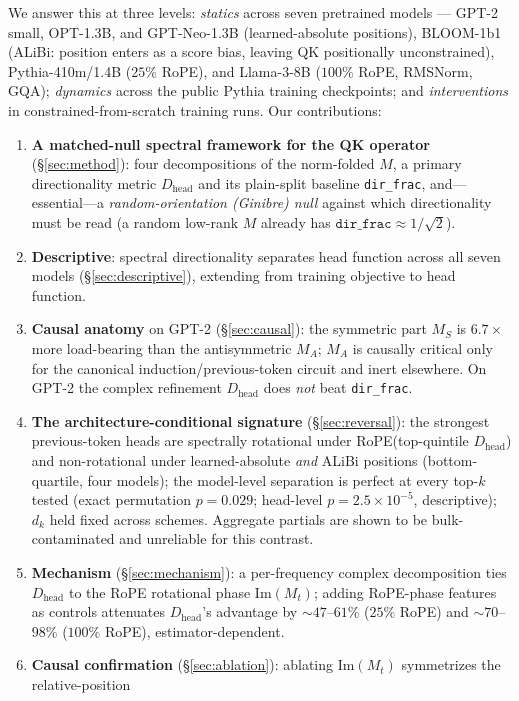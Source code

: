 \documentclass[11pt]{article}
\newcommand{\dirfrac}{\texttt{dir\_frac}\xspace}
\newcommand{\Dhead}{\ensuremath{D_{\text{head}}}\xspace}
\newcommand{\M}{\ensuremath{M}\xspace}
\newcommand{\MS}{\ensuremath{M_S}\xspace}
\newcommand{\MA}{\ensuremath{M_A}\xspace}
\newcommand{\Mt}{\ensuremath{M_t}\xspace}
\newcommand{\Rope}{RoPE\xspace}
\begin{document}
We answer this at three levels: \emph{statics} across seven pretrained models --- GPT-2 small, OPT-1.3B, and
GPT-Neo-1.3B (learned-absolute positions), BLOOM-1b1 (ALiBi: position enters as a score bias, leaving QK positionally
unconstrained), Pythia-410m/1.4B ($25\%$ \Rope), and Llama-3-8B ($100\%$ \Rope, RMSNorm, GQA); \emph{dynamics} across
the public Pythia training checkpoints; and \emph{interventions} in constrained-from-scratch training runs. Our
contributions:
\begin{enumerate}\itemsep2pt
\item \textbf{A matched-null spectral framework for the QK operator} (\S\ref{sec:method}): four decompositions of the
norm-folded \M, a primary directionality metric \Dhead and its plain-split baseline \dirfrac, and---essential---a
\emph{random-orientation (Ginibre) null} against which directionality must be read (a random low-rank \M already has
$\dirfrac\approx1/\sqrt2$).
\item \textbf{Descriptive}: spectral directionality separates head function across all seven models
(\S\ref{sec:descriptive}), extending \citet{saponati2025} from training objective to head function.
\item \textbf{Causal anatomy} on GPT-2 (\S\ref{sec:causal}): the symmetric part \MS is $6.7\times$ more load-bearing
than the antisymmetric \MA; \MA is causally critical only for the canonical induction/previous-token circuit and inert
elsewhere. On GPT-2 the complex refinement \Dhead does \emph{not} beat \dirfrac.
\item \textbf{The architecture-conditional signature} (\S\ref{sec:reversal}): the strongest previous-token heads
are spectrally rotational under \Rope (top-quintile \Dhead) and non-rotational under learned-absolute \emph{and}
ALiBi positions (bottom-quartile, four models); the model-level separation is perfect at every top-$k$ tested
(exact permutation $p{=}0.029$; head-level $p{=}2.5{\times}10^{-5}$, descriptive); $d_k$ held fixed across schemes.
Aggregate partials are shown to be bulk-contaminated and unreliable for this contrast.
\item \textbf{Mechanism} (\S\ref{sec:mechanism}): a per-frequency complex decomposition ties \Dhead to the \Rope
rotational phase $\mathrm{Im}(\Mt)$; adding \Rope-phase features as controls attenuates \Dhead's advantage by
${\sim}47$--$61\%$ ($25\%$ \Rope) and ${\sim}70$--$98\%$ ($100\%$ \Rope), estimator-dependent.
\item \textbf{Causal confirmation} (\S\ref{sec:ablation}): ablating $\mathrm{Im}(\Mt)$ symmetrizes the relative-position

\end{enumerate}
\end{document}
